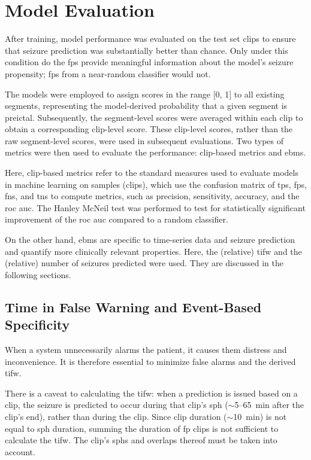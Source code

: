 \section{Model Evaluation} \label{sec:model-evaluation}
After training, model performance was evaluated on the test set clips to ensure that seizure prediction was substantially better than chance. 
Only under this condition do the \glspl{fp} provide meaningful information about the model’s seizure propensity; \glspl{fp} from a near‑random classifier would not.


The models were employed to assign scores in the range [0, 1] to all existing segments, representing the model-derived probability that a given segment is preictal.  
Subsequently, the segment-level scores were averaged within each clip to obtain a corresponding clip-level score.  
These clip-level scores, rather than the raw segment-level scores, were used in subsequent evaluations.
Two types of metrics were then used to evaluate the performance: clip-based metrics and \glspl{ebm}.

Here, clip-based metrics refer to the standard measures used to evaluate models in machine learning on samples (clips), which use the confusion matrix of \glspl{tp}, \glspl{fp}, \glspl{fn}, and \glspl{tn} to compute metrics, such as precision, sensitivity, accuracy, and the \gls{roc auc}.
The Hanley McNeil test \parencite{hanley_method_1983} was performed to test for statistically significant improvement of the \gls{roc auc} compared to a random classifier.

On the other hand, \glspl{ebm} are specific to time-series data and seizure prediction and quantify more clinically relevant properties.
Here, the (relative) \gls{tifw} \parencite{mormann_seizure_2007, eberlein_machine_2025} and the (relative) number of seizures predicted were used.
They are discussed in the following sections.

\subsection{Time in False Warning and Event-Based Specificity} \label{subsec:tifw}
When a system unnecessarily alarms the patient, it causes them distress and inconvenience.
It is therefore essential to minimize false alarms and the derived \gls{tifw}.

There is a caveat to calculating the \gls{tifw}: when a prediction is issued based on a clip, the seizure is predicted to occur during that clip's \gls{sph} ($\sim$\num{5}--\SI{65}{\minute} after the clip's end), rather than during the clip.
Since clip duration ($\sim$\SI{10}{\minute}) is not equal to \gls{sph} duration, summing the duration of \gls{fp} clips is not sufficient to calculate the \gls{tifw}.
The clip's \glspl{sph} and overlaps thereof must be taken into account.

